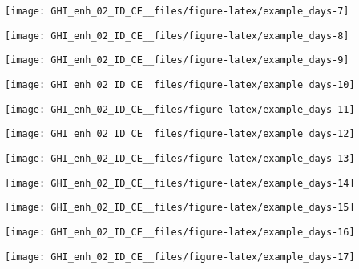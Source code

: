 \documentclass[
  10pt,
  a4paper,oneside]{article}
\begin{document}
\begin{center}\texttt{[image: GHI\_enh\_02\_ID\_CE\_\_files/figure-latex/example\_days-7]} \end{center}

\begin{center}\texttt{[image: GHI\_enh\_02\_ID\_CE\_\_files/figure-latex/example\_days-8]} \end{center}

\begin{center}\texttt{[image: GHI\_enh\_02\_ID\_CE\_\_files/figure-latex/example\_days-9]} \end{center}

\begin{center}\texttt{[image: GHI\_enh\_02\_ID\_CE\_\_files/figure-latex/example\_days-10]} \end{center}

\begin{center}\texttt{[image: GHI\_enh\_02\_ID\_CE\_\_files/figure-latex/example\_days-11]} \end{center}

\begin{center}\texttt{[image: GHI\_enh\_02\_ID\_CE\_\_files/figure-latex/example\_days-12]} \end{center}

\begin{center}\texttt{[image: GHI\_enh\_02\_ID\_CE\_\_files/figure-latex/example\_days-13]} \end{center}

\begin{center}\texttt{[image: GHI\_enh\_02\_ID\_CE\_\_files/figure-latex/example\_days-14]} \end{center}

\begin{center}\texttt{[image: GHI\_enh\_02\_ID\_CE\_\_files/figure-latex/example\_days-15]} \end{center}

\begin{center}\texttt{[image: GHI\_enh\_02\_ID\_CE\_\_files/figure-latex/example\_days-16]} \end{center}

\begin{center}\texttt{[image: GHI\_enh\_02\_ID\_CE\_\_files/figure-latex/example\_days-17]} \end{center}
\end{document}
